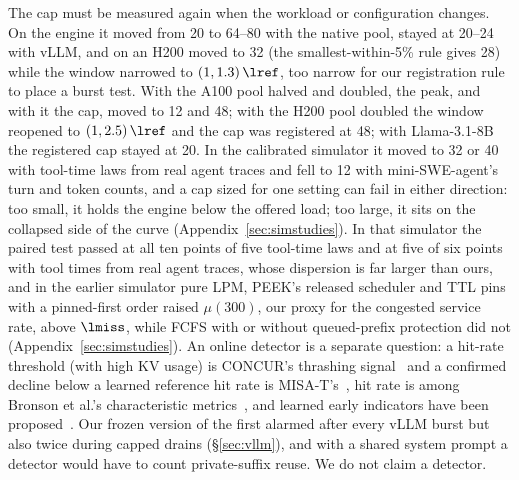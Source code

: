 The cap must be measured again when the workload or configuration changes. On the engine it moved from 20 to 64--80 with the native pool, stayed at 20--24 with vLLM, and on an H200 moved to 32 (the smallest-within-5\% rule gives 28) while the window narrowed to $(1,1.3)\,\lref$, too narrow for our registration rule to place a burst test. With the A100 pool halved and doubled, the peak, and with it the cap, moved to 12 and 48; with the H200 pool doubled the window reopened to $(1,2.5)\,\lref$ and the cap was registered at 48; with Llama-3.1-8B the registered cap stayed at 20. In the calibrated simulator it moved to 32 or 40 with tool-time laws from real agent traces and fell to 12 with mini-SWE-agent's turn and token counts, and a cap sized for one setting can fail in either direction: too small, it holds the engine below the offered load; too large, it sits on the collapsed side of the curve (Appendix~\ref{sec:simstudies}). In that simulator the paired test passed at all ten points of five tool-time laws and at five of six points with tool times from real agent traces, whose dispersion is far larger than ours, and in the earlier simulator pure LPM, PEEK's released scheduler and TTL pins with a pinned-first order raised $\mu(300)$, our proxy for the congested service rate, above $\lmiss$, while FCFS with or without queued-prefix protection did not (Appendix~\ref{sec:simstudies}). An online detector is a separate question: a hit-rate threshold (with high KV usage) is CONCUR's thrashing signal~\citep{chen2026concur} and a confirmed decline below a learned reference hit rate is MISA-T's~\citep{hong2026misat}, hit rate is among Bronson et al.'s characteristic metrics~\citep{bronson2021metastable}, and learned early indicators have been proposed~\citep{majumdar2026learning}. Our frozen version of the first alarmed after every vLLM burst but also twice during capped drains (\S\ref{sec:vllm}), and with a shared system prompt a detector would have to count private-suffix reuse. We do not claim a detector.
